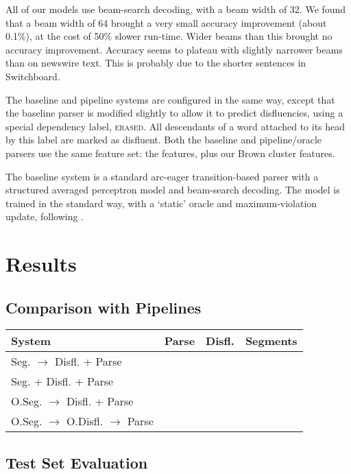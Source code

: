 \documentclass[11pt,letterpaper]{article}
\begin{document}
All of our models use beam-search decoding, with a beam width of 32. We found that
a beam width of 64 brought a very small accuracy improvement (about 0.1\%), at
the cost of 50\% slower run-time. Wider beams than this brought no accuracy improvement.
Accuracy seems to plateau with slightly narrower beams than on newswire text.
This is probably due to the shorter sentences in Switchboard.

The baseline and pipeline systems are configured in the same way, except that
the baseline parser is modified slightly to allow it to predict disfluencies,
using a special dependency label, \textsc{erased}.  All descendants of a word 
attached to its head by this label are marked as disfluent.
Both the baseline and pipeline/oracle parsers use the same feature set:
the \citet{zhang:11} features, plus our Brown cluster features.

The baseline system is a standard arc-eager
transition-based parser with a structured averaged perceptron model and beam-search
decoding.  The model is trained in the standard way, with a `static' oracle and
maximum-violation update, following \citep{huang:12}.

\section{Results}
\subsection{Comparison with Pipelines}

\begin{table}
    \centering
    \small
    \begin{tabular}{l|rrr}
        System & Parse & Disfl. & Segments \\
        \hline \hline
        Seg. $\rightarrow$ Disfl. + Parse & & & \\
        Seg. + Disfl. + Parse  & & & \\
        \hline
        O.Seg. $\rightarrow$ Disfl. + Parse & & & \\
        O.Seg. $\rightarrow$ O.Disfl. $\rightarrow$ Parse & & & \\
    \end{tabular}
\end{table}


\subsection{Test Set Evaluation}
\end{document}
